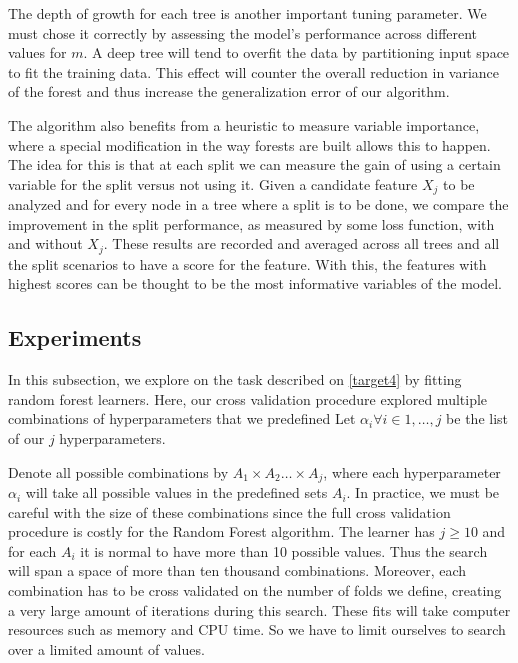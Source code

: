 The depth of growth for each tree is another important tuning parameter. 
We must chose it correctly by assessing the model's performance across different values for $m$. 
A deep tree will tend to overfit the data by partitioning input space to fit the training data. 
This effect will counter the overall reduction in variance of the forest and thus increase the generalization error of our algorithm.


The algorithm also benefits from a heuristic to measure variable importance, where a special modification in the way forests are built allows this to happen.
The idea for this is that at each split we can measure the gain of using a certain variable for the split versus not using it. 
Given a candidate feature $X_j$ to be analyzed and for every node in a tree where a split is to be done, we compare the improvement in the split performance, as measured by some loss function, with and without $X_j$.
These results are recorded and averaged across all trees and all the split scenarios to have a score for the feature.
With this, the features with highest scores can be thought to be the most informative variables of the model.

\subsection{Experiments}\label{subsection:random_forests_experiments}

In this subsection, we explore on the task described on \cref{target4} by fitting random forest learners.
Here, our cross validation procedure explored multiple combinations of hyperparameters that we predefined Let $\alpha_i \forall i \in {1,\ldots,j}$ be the list of our $j$ hyperparameters.

Denote all possible combinations by $A_1 \times A_2 \ldots \times  A_j$, where each hyperparameter $\alpha_i$ will take all possible values in the predefined sets $A_i$.
In practice, we must be careful with the size of these combinations since the full cross validation procedure is costly for the Random Forest algorithm.
The learner has $j \geq 10$ and for each $A_i$ it is normal to have more than 10 possible values.
Thus the search will span a space of more than ten thousand combinations.
Moreover, each combination has to be cross validated on the number of folds we define, creating a very large amount of iterations during this search.
These fits will take computer resources such as memory and CPU time.
So we have to limit ourselves to search over a limited amount of values.


